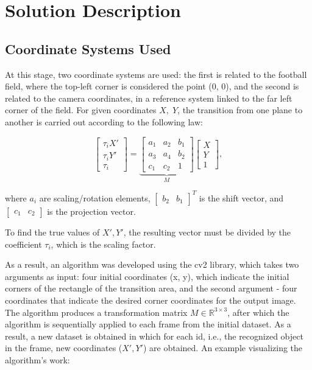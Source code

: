 \chapter{Solution Description}

 \section{Coordinate Systems Used}\label{41}
At this stage, two coordinate systems are used: the first is related to the football field, where the top-left corner is considered the point (0, 0), and the second is related to the camera coordinates, in a reference system linked to the far left corner of the field. For given coordinates $X,\;Y$, the transition from one plane to another is carried out according to the following law:

$$
\begin{bmatrix}
\tau_{i}X' \\
\tau_{i}Y' \\
\tau_{i}
\end{bmatrix} = 
\underbrace{ \begin{bmatrix}
a_{1} & a_{2} & b_{1} \\
a_{3} & a_{4} & b_{2} \\
c_{1} & c_{2} & 1
\end{bmatrix} }_{ M } \begin{bmatrix}
X \\
Y \\
1
\end{bmatrix},
$$

where $a_i$ are scaling/rotation elements, $\begin{bmatrix}
    b_2 & b_1
\end{bmatrix}^T$ is the shift vector, and $\begin{bmatrix}
    c_1 & c_2
\end{bmatrix}$ is the projection vector.

To find the true values of $X', Y'$, the resulting vector must be divided by the coefficient $\tau_i$, which is the scaling factor.

As a result, an algorithm was developed using the cv2 library, which takes two arguments as input: four initial coordinates (x, y), which indicate the initial corners of the rectangle of the transition area, and the second argument - four coordinates that indicate the desired corner coordinates for the output image. The algorithm produces a transformation matrix $M \in \mathbb{R}^{3 \times 3}$, after which the algorithm is sequentially applied to each frame from the initial dataset. As a result, a new dataset is obtained in which for each id, i.e., the recognized object in the frame, new coordinates ($X', Y'$) are obtained. An example visualizing the algorithm's work:

